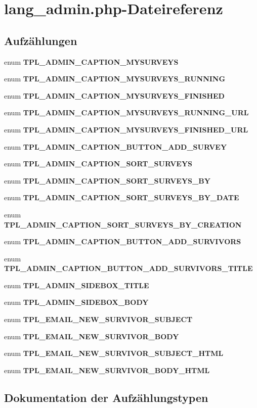 \section{lang\_\-admin.php-Dateireferenz}
\label{lang__admin_8php}
\subsection*{Aufzählungen}
\begin{CompactItemize}
\item 
enum {\bf TPL\_\-ADMIN\_\-CAPTION\_\-MYSURVEYS} 
\item 
enum {\bf TPL\_\-ADMIN\_\-CAPTION\_\-MYSURVEYS\_\-RUNNING} 
\item 
enum {\bf TPL\_\-ADMIN\_\-CAPTION\_\-MYSURVEYS\_\-FINISHED} 
\item 
enum {\bf TPL\_\-ADMIN\_\-CAPTION\_\-MYSURVEYS\_\-RUNNING\_\-URL} 
\item 
enum {\bf TPL\_\-ADMIN\_\-CAPTION\_\-MYSURVEYS\_\-FINISHED\_\-URL} 
\item 
enum {\bf TPL\_\-ADMIN\_\-CAPTION\_\-BUTTON\_\-ADD\_\-SURVEY} 
\item 
enum {\bf TPL\_\-ADMIN\_\-CAPTION\_\-SORT\_\-SURVEYS} 
\item 
enum {\bf TPL\_\-ADMIN\_\-CAPTION\_\-SORT\_\-SURVEYS\_\-BY} 
\item 
enum {\bf TPL\_\-ADMIN\_\-CAPTION\_\-SORT\_\-SURVEYS\_\-BY\_\-DATE} 
\item 
enum {\bf TPL\_\-ADMIN\_\-CAPTION\_\-SORT\_\-SURVEYS\_\-BY\_\-CREATION} 
\item 
enum {\bf TPL\_\-ADMIN\_\-CAPTION\_\-BUTTON\_\-ADD\_\-SURVIVORS} 
\item 
enum {\bf TPL\_\-ADMIN\_\-CAPTION\_\-BUTTON\_\-ADD\_\-SURVIVORS\_\-TITLE} 
\item 
enum {\bf TPL\_\-ADMIN\_\-SIDEBOX\_\-TITLE} 
\item 
enum {\bf TPL\_\-ADMIN\_\-SIDEBOX\_\-BODY} 
\item 
enum {\bf TPL\_\-EMAIL\_\-NEW\_\-SURVIVOR\_\-SUBJECT} 
\item 
enum {\bf TPL\_\-EMAIL\_\-NEW\_\-SURVIVOR\_\-BODY} 
\item 
enum {\bf TPL\_\-EMAIL\_\-NEW\_\-SURVIVOR\_\-SUBJECT\_\-HTML} 
\item 
enum {\bf TPL\_\-EMAIL\_\-NEW\_\-SURVIVOR\_\-BODY\_\-HTML} 
\end{CompactItemize}


\subsection{Dokumentation der Aufzählungstypen}
